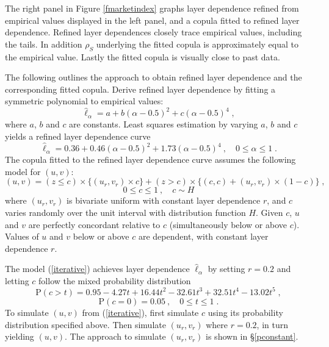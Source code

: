 \documentclass[authoryear]{elsarticle}
\newcommand{\p}{\mathrm{P}}
\newcommand{\cq}{\ ,\quad }
\newcommand{\eref}[1]{(\ref{#1})}
\newcommand{\fref}[1]{Figure \ref{#1}}
\newcommand{\sref}[1]{\S\ref{#1}}
\begin{document}
The right panel in \fref{fmarketindex} graphs layer dependence refined from empirical values displayed in the left panel, and a copula fitted to refined layer dependence. Refined layer dependences closely trace empirical values, including the tails. In addition  $\rho_S$ underlying the fitted copula is approximately equal to the empirical value. Lastly the fitted copula is visually close to past data.

The following outlines the approach to obtain refined layer dependence and the corresponding fitted copula. Derive refined layer dependence by fitting a symmetric polynomial to empirical values:
$$
\hat{\ell}_\alpha = a+b(\alpha-0.5)^2+c(\alpha-0.5)^4   \;,
$$
where $a$, $b$ and $c$ are constants. Least squares estimation by varying $a$, $b$ and $c$ yields a refined layer dependence curve
$$
\hat{\ell}_\alpha = 0.36+0.46(\alpha-0.5)^2+1.73(\alpha-0.5)^4 \cq 0\leq\alpha\leq1 \;.
$$
The copula fitted to the refined layer dependence curve assumes the following model for $(u,v)$:
$$
(u,v)=(z\leq c) \times \{(u_r,v_r)\times c\} +(z>c)\times \{(c,c)+(u_r,v_r)\times (1-c)\} \;,
$$
\begin{equation}\label{iterative}
0\leq c\leq 1 \cq c\sim H
\end{equation}
where $(u_r,v_r)$ is bivariate uniform with constant layer dependence $r$, and $c$ varies randomly over the unit interval with distribution function $H$. Given $c$, $u$ and $v$ are perfectly concordant relative to $c$ (simultaneously below or above $c$). Values of $u$ and $v$ below or above $c$ are dependent, with constant layer dependence $r$.

The model \eref{iterative} achieves layer dependence $\hat{\ell}_\alpha$ by setting $r=0.2$ and letting $c$ follow the mixed probability distribution
$$
\p(c>t)=0.95-4.27t+16.44t^2-32.61t^3+32.51t^4-13.02t^5 \;,
$$
$$
\p(c=0)=0.05 \cq 0\leq t\leq 1 \;.
$$
To simulate $(u,v)$ from \eref{iterative}, first simulate $c$ using its probability distribution specified above. Then simulate $(u_r,v_r)$ where $r=0.2$, in turn yielding $(u,v)$. The approach to simulate $(u_r,v_r)$ is shown in \sref{pconstant}.
\end{document}
